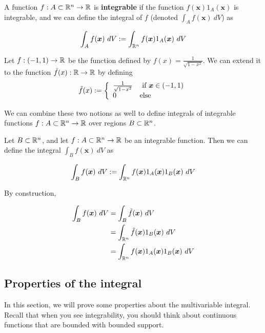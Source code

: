     

    \begin{definition}
    A function $f: A \subset \mathbb{R}^n \to \mathbb{R}$ is \textbf{integrable} if the function $f(\bm{x})1_A(\bm{x})$ is integrable, and we can define the integral of $f$ (denoted $\int_A f(\bm{x}) \ dV$) as

    $$\int_A f(\bm{x}) \ dV := \int_{\mathbb{R}^n} f(\bm{x})1_A(\bm{x}) \ dV$$
    
    \end{definition}

\begin{example}
    Let $f: (-1,1) \to \mathbb{R}$ be the function defined by $f(x) = \frac{1}{\sqrt{1-x^2}}$.  We can extend it to the function $\Tilde{f}(x) : \mathbb{R} \to \mathbb{R}$ by defining
    $$\Tilde{f}(x) := \left\{
		\begin{array}{ll}
			\frac{1}{\sqrt{1-x^2}} & \text{ if } \bm{x} \in (-1,1) \\
			0 & \text{else}
		\end{array}
		\right.$$
       
    \end{example}

    We can combine these two notions as well to define integrals of integrable functions $f : A \subset \mathbb{R}^n \to \mathbb{R}$ over regions $B \subset \mathbb{R}^n$.

    \begin{definition}
        Let $B \subset \mathbb{R}^n$, and let $f : A \subset \mathbb{R}^n \to \mathbb{R}$ be an integrable function. Then we can define the integral $\int_B f(\bm{x}) \ dV$ as

        $$\int_B f(\bm{x}) \ dV := \int_{\mathbb{R}^n} f(\bm{x})1_A(\bm{x})1_B(\bm{x}) \ dV$$
        
        By construction,

        \begin{align*}
        \int_B f(\bm{x}) \ dV &= \int_B \Tilde{f}(\bm{x}) \ dV \\
        &= \int_{\mathbb{R}^n} \Tilde{f}(\bm{x})1_B(\bm{x}) \ dV \\
        &= \int_{\mathbb{R}^n} f(\bm{x})1_A(\bm{x})1_B(\bm{x}) \ dV
    \end{align*}
    \end{definition}

\subsection{Properties of the integral}

In this section, we will prove some properties about the multivariable integral.  Recall that when you see integrability, you should think about continuous functions that are bounded with bounded support.

